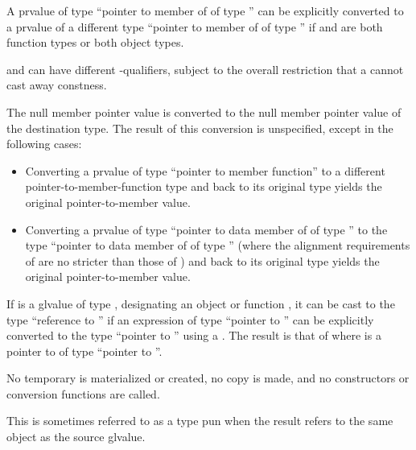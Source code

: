 \pnum
{}%
%
A prvalue of type ``pointer to member of  of type ''
can be explicitly converted to a prvalue of a different type ``pointer to member of
 of type '' if  and  are both
function types or both object types.
\begin{footnote}
 and  can have
different \cv-qualifiers, subject to
the overall restriction that a  cannot cast away
constness.
\end{footnote}
The null member pointer value is converted to the
null member pointer value of the destination type. The result of this
conversion is unspecified, except in the following cases:

\begin{itemize}
\item Converting a prvalue of type ``pointer to member function'' to a
different pointer-to-member-function type and back to its original type
yields the original pointer-to-member value.

\item Converting a prvalue of type ``pointer to data member of 
of type '' to the type ``pointer to data member of 
of type '' (where the alignment requirements of  are
no stricter than those of ) and back to its original type
yields the original pointer-to-member value.
\end{itemize}

\pnum
{}%
%
%
If  is a glvalue of type ,
designating an object or function ,
it can be cast to the type ``reference to ''
if an expression of type ``pointer to ''
can be explicitly converted to the type ``pointer to ''
using a .
The result is that of 
where  is a pointer to 
of type ``pointer to ''.
\begin{note}
No temporary is materialized or created,
no copy is made, and
no constructors or conversion
functions are called.
\begin{footnote}
This is sometimes referred to as a type pun
when the result refers to the same object as the source glvalue.
\end{footnote}
\end{note}

